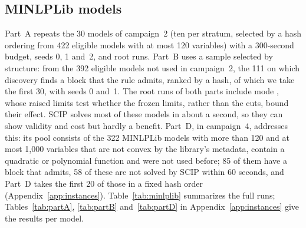 \subsection{MINLPLib models}\label{sec:minlplib}

Part~A repeats the 30 models of campaign~2 (ten per stratum, selected by a
hash ordering from 422 eligible models with at most 120 variables) with a
300-second budget, seeds 0, 1 and~2, and root runs. Part~B uses a sample
selected by structure: from the 392 eligible models not used in campaign~2,
the 111 on which discovery finds a block that the  rule admits,
ranked by a hash, of which we take the first 30, with seeds 0 and~1. The root
runs of both parts include mode , whose raised limits test
whether the frozen limits, rather than the cuts, bound their effect. SCIP
solves most of these models in about a second, so they can show validity and
cost but hardly a benefit. Part~D, in campaign~4, addresses this: its pool
consists of the 322 MINLPLib models with more than 120 and at most 1{,}000
variables that are not convex by the library's metadata, contain a quadratic
or polynomial function and were not used before; 85 of them have a block that
 admits, 58 of these are not solved by SCIP within 60 seconds, and
Part~D takes the first 20 of those in a fixed hash order
(Appendix~\ref{app:instances}). Table~\ref{tab:minlplib} summarizes the full
runs; Tables~\ref{tab:partA}, \ref{tab:partB} and~\ref{tab:partD} in
Appendix~\ref{app:instances} give the results per model.


